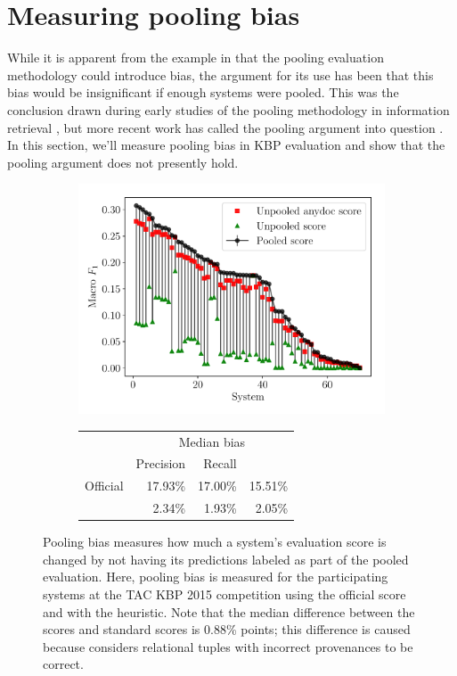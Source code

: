 \section{Measuring pooling bias}
\label{sec:analysis}

While it is apparent from the example in  that the pooling evaluation methodology could introduce bias, the argument for its use has been that this bias would be insignificant if enough systems were pooled.
This was the conclusion drawn during early studies of the pooling methodology in information retrieval \citep{zobel1998reliable,voorhees1999overview}, but more recent work has called the pooling argument into question \citep{buckley2004incomplete,buckley2007bias}.
In this section, we'll measure pooling bias in KBP evaluation and show that the pooling argument does not presently hold.

\begin{figure}[t]
  \centering
  \begin{subfigure}{\columnwidth}
      \includegraphics[width=\columnwidth]{figures/pooling_bias/pooling_bias}
    \centering
    \small{\begin{tabular} {l r r r} \toprule
                    & \multicolumn{3}{c}{Median bias} \\
                    & Precision & Recall & \fone{} \\ \midrule 
   Official         & 17.93\% &  17.00\% & 15.51\% \\ 
   \anydoc{}        & 2.34\% &  1.93\% & 2.05\% \\ \bottomrule
   \end{tabular}}
  \end{subfigure}
  \caption{\label{fig:pooling-bias} Pooling bias measures how much a system's evaluation score is changed by not having its predictions labeled as part of the pooled evaluation.
  Here, pooling bias is measured for the participating systems at the TAC KBP 2015 competition using the official score and with the \anydoc{} heuristic.
  Note that the median difference between the \anydoc{} scores and standard scores is 0.88\% points; this difference is caused because \anydoc{} considers relational tuples with incorrect provenances to be correct.}
\end{figure}
